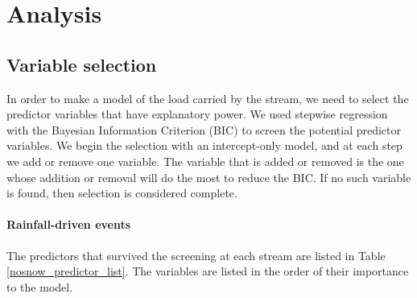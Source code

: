 \documentclass[10pt]{article}
\begin{document}
\section{Analysis}

\subsection{Variable selection}
In order to make a model of the load carried by the stream, we need to select the predictor variables that have explanatory power. We used stepwise regression with the Bayesian Information Criterion (BIC) to screen the potential predictor variables. We begin the selection with an intercept-only model, and at each step we add or remove one variable. The variable that is added or removed is the one whose addition or removal will do the most to reduce the BIC. If no such variable is found, then selection is considered complete.\\

\paragraph{Rainfall-driven events} The predictors that survived the screening at each stream are listed in Table \ref{nosnow_predictor_list}. The variables are listed in the order of their importance to the model.\\
\end{document}
